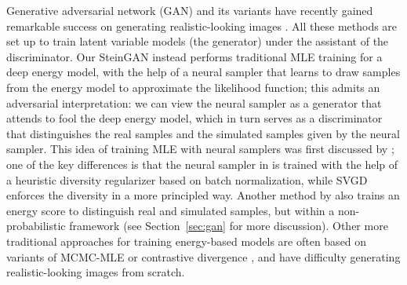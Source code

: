 \documentclass{article} %
\begin{document}
Generative adversarial network (GAN) and its variants have recently gained remarkable success on generating realistic-looking images 
\citep{goodfellow2014generative, salimans2016improved, radford2015unsupervised, li2015generative,dziugaite2015training,nowozin2016f}.  
All these methods are set up to train latent variable models (the generator) under the assistant of the discriminator.  
Our SteinGAN instead performs traditional MLE training for a deep energy model, 
 with the help of a neural sampler that learns to draw samples from the energy model to approximate the likelihood function; 
 this admits an adversarial interpretation: we can view the neural sampler as a generator that attends to fool the deep energy model, which in turn serves as a discriminator 
that distinguishes the real samples and the simulated samples given by the neural sampler. 
This idea of training MLE with neural samplers was first discussed by \citet{kim2016deep}; 
one of the key differences is that the neural sampler in \citet{kim2016deep} 
is trained with the help of a heuristic diversity regularizer based on batch normalization, while 
SVGD enforces the diversity in a more principled way. 
Another method by \citet{zhao2016energy} also trains an energy score to distinguish real and simulated samples, but within a non-probabilistic framework (see Section~\ref{sec:gan} for more discussion). 
Other more traditional approaches for training energy-based models  \citep[e.g.,][]{ngiam2011learning, xie2016theory} are often based on variants of MCMC-MLE or contrastive divergence \citep{geyer1991markov, hinton2002training, tieleman2008training}, and have difficulty generating realistic-looking images from scratch. 
\end{document}
